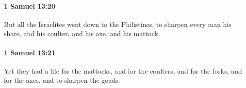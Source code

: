 		\paragraph{1 Samuel 13:20} %
			\label{1SAMUEL-13-20}

			But all the Israelites went down to the Philistines, to sharpen every man his share, and his coulter, and his axe, and his mattock.


		\paragraph{1 Samuel 13:21} %
			\label{1SAMUEL-13-21}

			Yet they had a file for the mattocks, and for the coulters, and for the forks, and for the axes, and to sharpen the goads.


